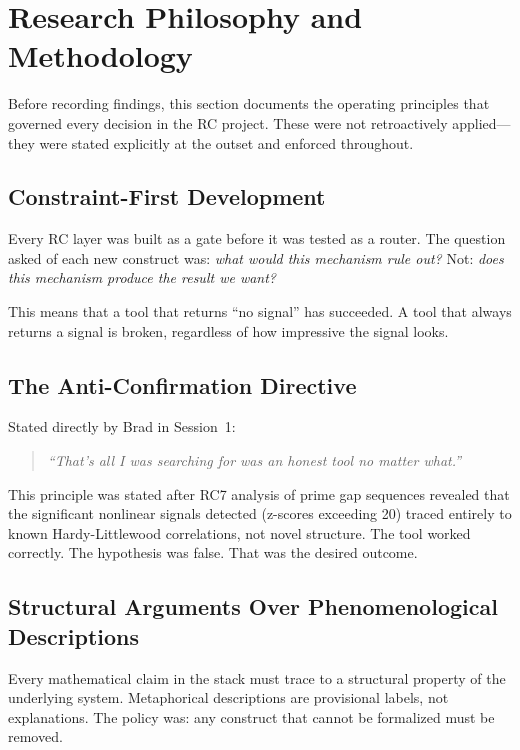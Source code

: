 \documentclass[11pt,twoside]{article}
\begin{document}
\section{Research Philosophy and Methodology}

Before recording findings, this section documents the operating principles that governed
every decision in the RC project. These were not retroactively applied---they were stated
explicitly at the outset and enforced throughout.

\subsection{Constraint-First Development}

Every RC layer was built as a gate before it was tested as a router. The question
asked of each new construct was: \emph{what would this mechanism rule out?} Not:
\emph{does this mechanism produce the result we want?}

This means that a tool that returns ``no signal'' has succeeded. A tool that always
returns a signal is broken, regardless of how impressive the signal looks.

\subsection{The Anti-Confirmation Directive}

Stated directly by Brad in Session~1:

\begin{quote}
\emph{``That's all I was searching for was an honest tool no matter what.''}
\end{quote}

This principle was stated after RC7 analysis of prime gap sequences revealed that the
significant nonlinear signals detected (z-scores exceeding 20) traced entirely to
known Hardy-Littlewood correlations, not novel structure. The tool worked correctly.
The hypothesis was false. That was the desired outcome.

\subsection{Structural Arguments Over Phenomenological Descriptions}

Every mathematical claim in the stack must trace to a structural property of the
underlying system. Metaphorical descriptions are provisional labels, not explanations.
The policy was: any construct that cannot be formalized must be removed.
\end{document}
